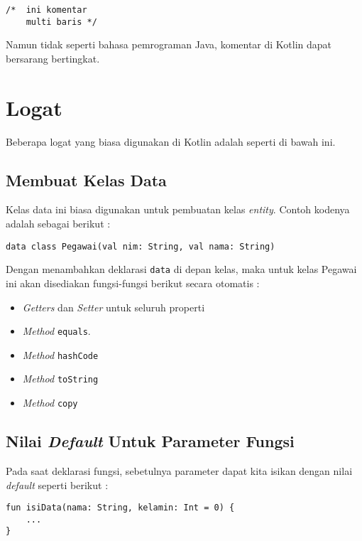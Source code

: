 \begin{lstlisting}
/*  ini komentar
    multi baris */
\end{lstlisting}

Namun tidak seperti bahasa pemrograman Java, komentar di Kotlin dapat bersarang bertingkat.

\section{Logat}

Beberapa logat yang biasa digunakan di Kotlin adalah seperti di bawah ini.

\subsection{Membuat Kelas Data}

Kelas data ini biasa digunakan untuk pembuatan kelas \textit{entity}. Contoh kodenya adalah sebagai berikut :

\begin{lstlisting}
data class Pegawai(val nim: String, val nama: String)
\end{lstlisting}

Dengan menambahkan deklarasi \texttt{data} di depan kelas, maka untuk kelas Pegawai ini akan disediakan fungsi-fungsi berikut secara otomatis :

\begin{itemize}
\item \textit{Getters} dan \textit{Setter} untuk seluruh properti
\item \textit{Method} \texttt{equals}.
\item \textit{Method} \texttt{hashCode}
\item \textit{Method} \texttt{toString}
\item \textit{Method} \texttt{copy}
\end{itemize}

\subsection{Nilai \textit{Default} Untuk Parameter Fungsi}

Pada saat deklarasi fungsi, sebetulnya parameter dapat kita isikan dengan nilai \textit{default} seperti berikut :

\begin{lstlisting}
fun isiData(nama: String, kelamin: Int = 0) {
	...
}
\end{lstlisting}


